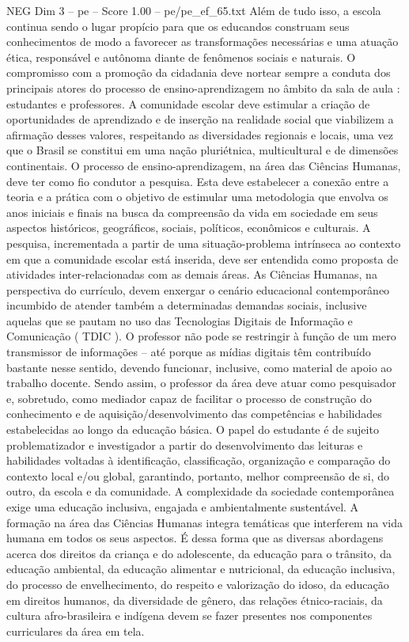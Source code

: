 \begin{textsample}{NEG Dim 3 – pe – Score 1.00 – pe/pe\_ef\_65.txt}
Além de tudo isso, a escola continua sendo o lugar propício para que os educandos construam seus conhecimentos de modo a favorecer as transformações necessárias e uma atuação ética, responsável e autônoma diante de fenômenos sociais e naturais.
O compromisso com a promoção da cidadania deve nortear sempre a conduta dos principais atores do processo de ensino-aprendizagem no âmbito da sala de aula : estudantes e professores.
A comunidade escolar deve estimular a criação de oportunidades de aprendizado e de inserção na realidade social que viabilizem a afirmação desses valores, respeitando as diversidades regionais e locais, uma vez que o Brasil se constitui em uma nação pluriétnica, multicultural e de dimensões continentais.
O processo de ensino-aprendizagem, na área das Ciências Humanas, deve ter como fio condutor a pesquisa.
Esta deve estabelecer a conexão entre a teoria e a prática com o objetivo de estimular uma metodologia que envolva os anos iniciais e finais na busca da compreensão da vida em sociedade em seus aspectos históricos, geográficos, sociais, políticos, econômicos e culturais.
A pesquisa, incrementada a partir de uma situação-problema intrínseca ao contexto em que a comunidade escolar está inserida, deve ser entendida como proposta de atividades inter-relacionadas com as demais áreas.
As Ciências Humanas, na perspectiva do currículo, devem enxergar o cenário educacional contemporâneo incumbido de atender também a determinadas demandas sociais, inclusive aquelas que se pautam no uso das Tecnologias Digitais de Informação e Comunicação ( TDIC ).
O professor não pode se restringir à função de um mero transmissor de informações – até porque as mídias digitais têm contribuído bastante nesse sentido, devendo funcionar, inclusive, como material de apoio ao trabalho docente.
Sendo assim, o professor da área deve atuar como pesquisador e, sobretudo, como mediador capaz de facilitar o processo de construção do conhecimento e de aquisição/desenvolvimento das competências e habilidades estabelecidas ao longo da educação básica.
O papel do estudante é de sujeito problematizador e investigador a partir do desenvolvimento das leituras e habilidades voltadas à identificação, classificação, organização e comparação do contexto local e/ou global, garantindo, portanto, melhor compreensão de si, do outro, da escola e da comunidade.
A complexidade da sociedade contemporânea exige uma educação inclusiva, engajada e ambientalmente sustentável.
A formação na área das Ciências Humanas integra temáticas que interferem na vida humana em todos os seus aspectos.
É dessa forma que as diversas abordagens acerca dos direitos da criança e do adolescente, da educação para o trânsito, da educação ambiental, da educação alimentar e nutricional, da educação inclusiva, do processo de envelhecimento, do respeito e valorização do idoso, da educação em direitos humanos, da diversidade de gênero, das relações étnico-raciais, da cultura afro-brasileira e indígena devem se fazer presentes nos componentes curriculares da área em tela.

\end{textsample}
